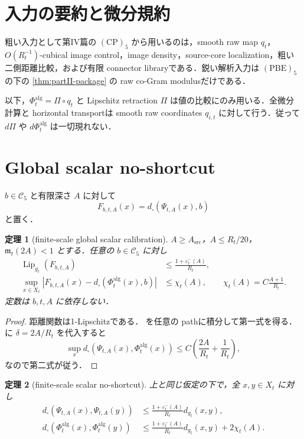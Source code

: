 \documentclass[a4paper,11pt]{ltjsarticle}
\numberwithin{equation}{section}
\theoremstyle{plain}
\newtheorem{theorem}{定理}[section]
\theoremstyle{definition}
\theoremstyle{remark}
\newcommand{\cC}{\mathcal C}
\newcommand{\eps}{\varepsilon}
\newcommand{\Lip}{\operatorname{Lip}}
\begin{document}
\section{入力の要約と微分規約}\label{sec:first-paper-inputs}
粗い入力として第IV篇の $\mathrm{(CP)}_5$ から用いるのは，smooth raw map $q_t$，$O(R_t^{-1})$-cubical image control，image density，source-core localization，粗い二側距離比較，および有限 connector libraryである．鋭い解析入力は $\mathrm{(PBE)}_5$ の下の \cref{thm:partII-package} の raw co-Gram modulusだけである．

以下，$\Phi_t^{\mathrm{alg}}=\Pi\circ q_t$ と Lipschitz retraction $\Pi$ は値の比較にのみ用いる．全微分計算と horizontal transportは smooth raw coordinates $q_{i,t}$ に対して行う．従って $d\Pi$ や $d\Phi_t^{\mathrm{alg}}$ は一切現れない．

\section{Global scalar no-shortcut}\label{sec:scalar}

$b\in\cC_5$ と有限深さ $A$ に対して
\begin{equation}\label{eq:Fbt}
 F_{b,t,A}(x)=d_\square(\Psi_{t,A}(x),b)
\end{equation}
と置く．

\begin{theorem}[finite-scale global scalar calibration]\label{thm:global-scalar-calibration}
$A\ge A_{\mathrm{src}}$，$A\le R_t/20$，$\mathfrak m_t(2A)<1$ とする．任意の $b\in\cC_5$ に対し
\begin{align}
 \Lip_{g_t}(F_{b,t,A})
 &\le\frac{1+\eps^-_t(A)}{R_t},
 \label{eq:F-global-lip}\\
 \sup_{x\in X_t}\left|F_{b,t,A}(x)-d_\square(\Phi_t^{\mathrm{alg}}(x),b)\right|
 &\le\chi_t(A),
 \qquad
 \chi_t(A)=C\frac{A+1}{R_t}.
 \label{eq:F-global-value}
\end{align}
定数は $b,t,A$ に依存しない．
\end{theorem}

\begin{proof}
距離関数は1-Lipschitzである． を任意の pathに積分して第一式を得る．
 に $\delta=2A/R_t$ を代入すると
\[
 \sup_x d_\square(\Psi_{t,A}(x),\Phi_t^{\mathrm{alg}}(x))
 \le C\left(\frac{2A}{R_t}+\frac1{R_t}\right),
\]
なので第二式が従う．
\end{proof}

\begin{theorem}[finite-scale scalar no-shortcut]\label{thm:scalar-no-shortcut}
上と同じ仮定の下で，全 $x,y\in X_t$ に対し
\begin{align}
 d_\square(\Psi_{t,A}(x),\Psi_{t,A}(y))
 &\le\frac{1+\eps^-_t(A)}{R_t}d_{g_t}(x,y),
 \label{eq:raw-global-lower}\\
 d_\square(\Phi_t^{\mathrm{alg}}(x),\Phi_t^{\mathrm{alg}}(y))
 &\le\frac{1+\eps^-_t(A)}{R_t}d_{g_t}(x,y)+2\chi_t(A).
 \label{eq:global-lower}
\end{align}
\end{theorem}
\end{document}

